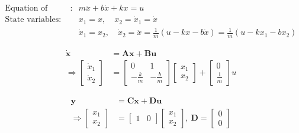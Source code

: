 \documentclass[a4paper]{article}
\begin{document}
\begin{minipage}{0.75\textwidth}
\begin{align*}
    \text{Equation of motion}:&\ m\ddot{x}+b\dot{x}+kx = u\\
    \text{State variables}:&\ x_1 =x,\quad x_2 = \dot{x}_1 = \dot{x}\\
    &\ \dot{x}_1 = x_2,\quad \dot{x}_2 = \ddot{x} = \frac{1}{m}(u-kx-b\dot{x})=\frac{1}{m}(u-kx_1-bx_2) 
\end{align*}
\begin{minipage}{0.3\textwidth}
\begin{center}
\begin{align*}
    \mathbf{\dot{x}} &= \mathbf{Ax} + \mathbf{Bu}\\
    \Rightarrow \begin{bmatrix}\dot{x}_1\\ \dot{x}_2\end{bmatrix} &= 
    \begin{bmatrix}0 & 1\\-\frac{k}{m}&-\frac{b}{m}\end{bmatrix}
    \begin{bmatrix}x_1\\x_2\end{bmatrix}+
    \begin{bmatrix}0\\ \frac{1}{m}\end{bmatrix}u
\end{align*}
\end{center}
\end{minipage}
\begin{minipage}{0.15\textwidth}
\quad
\end{minipage}
\begin{minipage}{0.3\textwidth}
\begin{center}
\begin{align*}
    \mathbf{y} &= \mathbf{Cx}+\mathbf{Du}\\
    \Rightarrow \begin{bmatrix}x_1\\x_2\end{bmatrix}&=
    \begin{bmatrix}1 & 0\end{bmatrix}
    \begin{bmatrix}x_1\\x_2\end{bmatrix},\
    \mathbf{D} = \begin{bmatrix}0\\0\end{bmatrix}
\end{align*}
\end{center}
\end{minipage}
\end{minipage}
\end{document}
